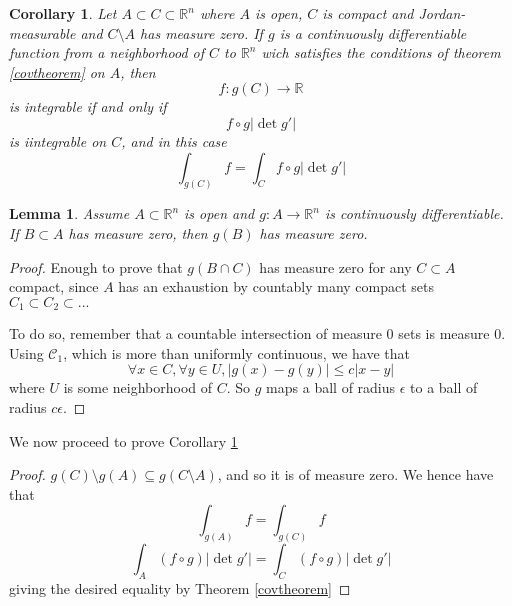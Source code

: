 \documentclass{article}
\newtheorem{lemma}{Lemma}
\newtheorem*{corollary}{Corollary}
\newcommand{\reals}[0]{\mathbb{R}}
\newcommand{\mc}[1]{\mathcal{#1}}
\begin{document}
\begin{corollary}
  Let \(A \subset C \subset \reals^n\) where \(A\) is open, \(C\) is compact and Jordan-measurable and \(C \setminus A\) has measure zero. If \(g\) is a continuously differentiable function from a neighborhood of \(C\) to \(\reals^n\) wich satisfies the conditions of theorem \ref{covtheorem} on \(A\), then
  \begin{equation}
    f: g(C) \to \reals
  \end{equation}
  is integrable if and only if
  \begin{equation}
    f \circ g|\det g'|
  \end{equation}
  is iintegrable on \(C\), and in this case
  \begin{equation}
    \int_{g(C)}f = \int_Cf \circ g|\det g'|
  \end{equation}
  \label{corcov}
\end{corollary}
\begin{lemma}
  Assume \(A \subset \reals^n\) is open and \(g: A \to \reals^n\) is continuously differentiable. If \(B \subset A\) has measure zero, then \(g(B)\) has measure zero.
\end{lemma}
\begin{proof}
  Enough to prove that \(g(B \cap C)\) has measure zero for any \(C \subset A\) compact, since \(A\) has an exhaustion by countably many compact sets \(C_1 \subset C_2 \subset ...\)

  To do so, remember that a countable intersection of measure 0 sets is measure 0. Using \(\mc{C}_1\), which is more than uniformly continuous, we have that
  \begin{equation}
    \forall x \in C, \forall y \in U, |g(x) - g(y)| \leq c|x - y|
  \end{equation}
  where \(U\) is some neighborhood of \(C\). So \(g\) maps a ball of radius \(\epsilon\) to a ball of radius \(c\epsilon\).
\end{proof}
We now proceed to prove Corollary \ref{corcov}
\begin{proof}
  \(g(C) \setminus g(A) \subseteq g(C \setminus A)\), and so it is of measure zero. We hence have that
  \begin{equation}
    \int_{g(A)}f = \int_{g(C)}f
  \end{equation}
  \begin{equation}
    \int_A(f \circ g)|\det g'| = \int_{C}(f \circ g)|\det g'|
  \end{equation}
  giving the desired equality by Theorem \ref{covtheorem}
\end{proof}
\end{document}
